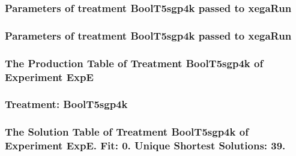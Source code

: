 \documentclass[18pt,c]{beamer}
\begin{document}

 \begin{frame}
 \fontsize{8pt}{9pt}\selectfont
 \frametitle{  Parameters of treatment BoolT5sgp4k passed to xegaRun
 }

 \label{ExpEtParmTable030.tex}  
 \end{frame}


 \begin{frame}
 \fontsize{8pt}{9pt}\selectfont
 \frametitle{  Parameters of treatment BoolT5sgp4k passed to xegaRun
 }

 \label{ExpEtParmTable031.tex}  
 \end{frame}

 \begin{frame}
 \fontsize{8pt}{9pt}\selectfont
 \frametitle{ The Production Table of Treatment BoolT5sgp4k of Experiment ExpE }

 \label{ExpEGrammarTable010.tex}  
 \end{frame}

 \begin{frame}
 \fontsize{8pt}{9pt}\selectfont
 \frametitle{ Treatment: BoolT5sgp4k }

 \label{ExpEStatsTable010.tex}  
 \end{frame}

 \begin{frame}
 \fontsize{8pt}{9pt}\selectfont
 \frametitle{ The Solution Table of Treatment BoolT5sgp4k of Experiment ExpE. Fit: 0. Unique Shortest Solutions: 39. }

 \label{ExpESolutionTable007.tex}  
 \end{frame}
\end{document}
